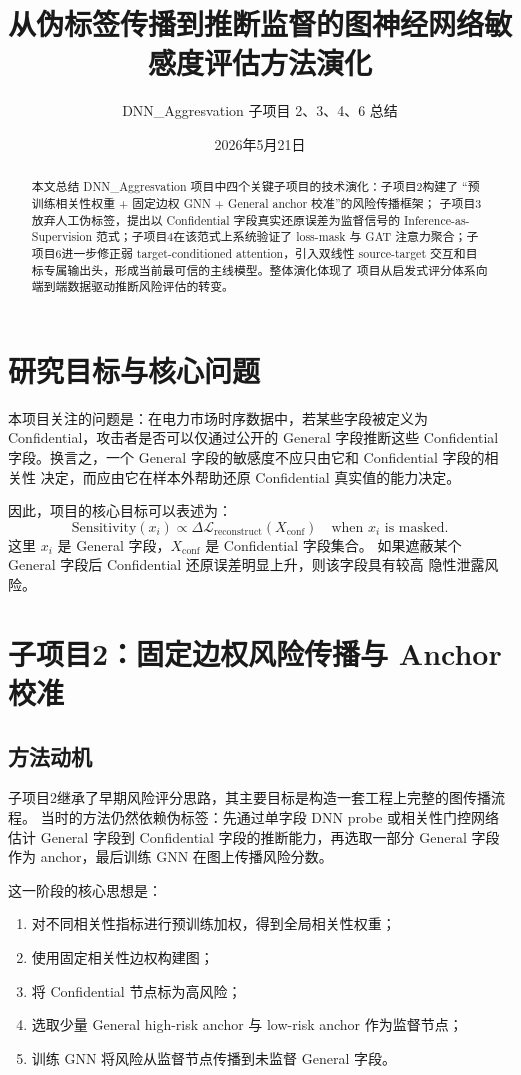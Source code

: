 \documentclass[UTF8,a4paper,11pt]{ctexart}
\title{从伪标签传播到推断监督的图神经网络敏感度评估方法演化}
\author{DNN\_Aggresvation 子项目 2、3、4、6 总结}
\date{2026年5月21日}
\begin{document}
\maketitle

\begin{abstract}
本文总结 DNN\_Aggresvation 项目中四个关键子项目的技术演化：子项目2构建了
``预训练相关性权重 + 固定边权 GNN + General anchor 校准''的风险传播框架；
子项目3放弃人工伪标签，提出以 Confidential 字段真实还原误差为监督信号的
Inference-as-Supervision 范式；子项目4在该范式上系统验证了 loss-mask 与 GAT
注意力聚合；子项目6进一步修正弱 target-conditioned attention，引入双线性
source-target 交互和目标专属输出头，形成当前最可信的主线模型。整体演化体现了
项目从启发式评分体系向端到端数据驱动推断风险评估的转变。
\end{abstract}

\section{研究目标与核心问题}

本项目关注的问题是：在电力市场时序数据中，若某些字段被定义为
Confidential，攻击者是否可以仅通过公开的 General 字段推断这些 Confidential
字段。换言之，一个 General 字段的敏感度不应只由它和 Confidential 字段的相关性
决定，而应由它在样本外帮助还原 Confidential 真实值的能力决定。

因此，项目的核心目标可以表述为：
\[
  \text{Sensitivity}(x_i)
  \propto
  \Delta \mathcal{L}_{\text{reconstruct}}(X_{\text{conf}})
  \quad \text{when } x_i \text{ is masked}.
\]
这里 $x_i$ 是 General 字段，$X_{\text{conf}}$ 是 Confidential 字段集合。
如果遮蔽某个 General 字段后 Confidential 还原误差明显上升，则该字段具有较高
隐性泄露风险。

\section{子项目2：固定边权风险传播与 Anchor 校准}

\subsection{方法动机}

子项目2继承了早期风险评分思路，其主要目标是构造一套工程上完整的图传播流程。
当时的方法仍然依赖伪标签：先通过单字段 DNN probe 或相关性门控网络估计
General 字段到 Confidential 字段的推断能力，再选取一部分 General 字段作为
anchor，最后训练 GNN 在图上传播风险分数。

这一阶段的核心思想是：
\begin{enumerate}
  \item 对不同相关性指标进行预训练加权，得到全局相关性权重；
  \item 使用固定相关性边权构建图；
  \item 将 Confidential 节点标为高风险；
  \item 选取少量 General high-risk anchor 与 low-risk anchor 作为监督节点；
  \item 训练 GNN 将风险从监督节点传播到未监督 General 字段。
\end{enumerate}
\end{document}
